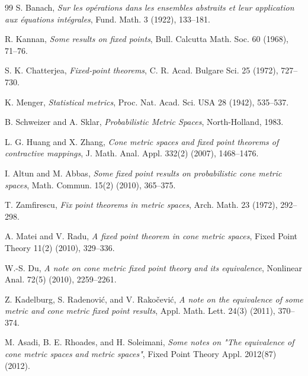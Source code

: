 \documentclass{amsart}
\theoremstyle{definition}
\theoremstyle{remark}
\numberwithin{equation}{section}
\begin{document}
\begin{thebibliography}{99}
 S. Banach, \emph{Sur les opérations dans les ensembles abstraits et leur application aux équations intégrales}, Fund. Math. 3 (1922), 133–181.

 R. Kannan, \emph{Some results on fixed points}, Bull. Calcutta Math. Soc. 60 (1968), 71–76.

 S. K. Chatterjea, \emph{Fixed-point theorems}, C. R. Acad. Bulgare Sci. 25 (1972), 727–730.

 K. Menger, \emph{Statistical metrics}, Proc. Nat. Acad. Sci. USA 28 (1942), 535–537.

 B. Schweizer and A. Sklar, \emph{Probabilistic Metric Spaces}, North-Holland, 1983.

 L. G. Huang and X. Zhang, \emph{Cone metric spaces and fixed point theorems of contractive mappings}, J. Math. Anal. Appl. 332(2) (2007), 1468–1476.

 I. Altun and M. Abbas, \emph{Some fixed point results on probabilistic cone metric spaces}, Math. Commun. 15(2) (2010), 365–375.

 T. Zamfirescu, \emph{Fix point theorems in metric spaces}, Arch. Math. 23 (1972), 292–298.

 A. Matei and V. Radu, \emph{A fixed point theorem in cone metric spaces}, Fixed Point Theory 11(2) (2010), 329–336.

 W.-S. Du, \emph{A note on cone metric fixed point theory and its equivalence}, Nonlinear Anal. 72(5) (2010), 2259–2261.

 Z. Kadelburg, S. Radenović, and V. Rakočević, \emph{A note on the equivalence of some metric and cone metric fixed point results}, Appl. Math. Lett. 24(3) (2011), 370–374.

 M. Asadi, B. E. Rhoades, and H. Soleimani, \emph{Some notes on "The equivalence of cone metric spaces and metric spaces"}, Fixed Point Theory Appl. 2012(87) (2012).

\end{thebibliography}

\end{document}
